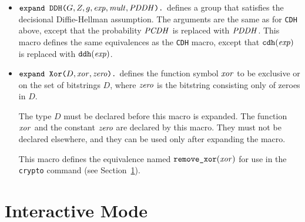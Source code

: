 \documentclass{article}
\begin{document}
\begin{itemize}
\item $\texttt{expand\ DDH(}G, Z, g, \mathit{exp}, \mathit{mult},
  \mathit{PDDH}\texttt{).}$ defines a group that satisfies the decisional
  Diffie-Hellman assumption. The arguments are the same as for
  \texttt{CDH} above, except that the probability $\mathit{PCDH}$ is
  replaced with $\mathit{PDDH}$. This macro defines the same equivalences
as the \texttt{CDH} macro, except that $\texttt{cdh}(\mathit{exp})$ is replaced
with $\texttt{ddh}(\mathit{exp})$.

\item $\texttt{expand\ Xor(}D, \mathit{xor}, \mathit{zero}\texttt{).}$ defines the
  function symbol $\mathit{xor}$ to be exclusive or on the set of
  bitstrings $D$, where $\mathit{zero}$ is the bitstring consisting only
  of zeroes in $D$.

  The type $D$ must be declared before this macro is expanded. The
  function $\mathit{xor}$ and the constant $\mathit{zero}$ are declared by
  this macro.  They must not be declared elsewhere, and they can be
  used only after expanding the macro.

   This macro defines the equivalence named $\texttt{remove\_xor}(\mathit{xor})$
   for use in the \texttt{crypto} command 
   (see Section~\ref{sec:interact}).

\end{itemize}


\section{Interactive Mode}\label{sec:interact}
\end{document}
